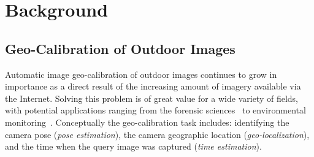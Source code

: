 \section{Background}

\subsection{Geo-Calibration of Outdoor Images}
Automatic image geo-calibration of outdoor images continues to grow in
importance as a direct result of the increasing amount of imagery
available via the Internet.  Solving this problem is of great value
for a wide variety of fields, with potential applications ranging from
the forensic sciences~\cite{stylianou13jane} to environmental
monitoring~\cite{zhang2012mining}.  Conceptually the geo-calibration
task includes: identifying the camera pose ({\em pose estimation}),
the camera geographic location ({\em geo-localization}), and the time
when the query image was captured ({\em time estimation}).

